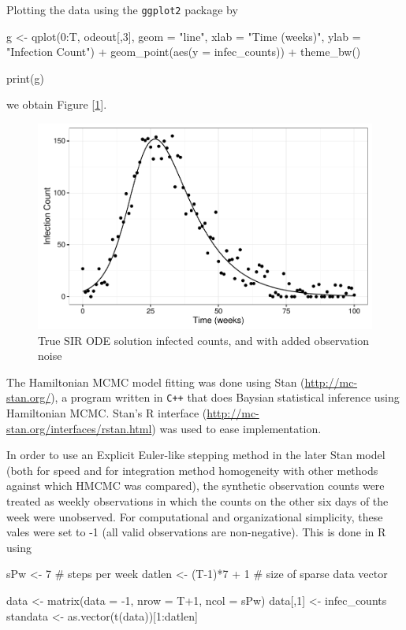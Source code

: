     Plotting the data using the \verb|ggplot2| package by

    \begin{R}
	g <- qplot(0:T, odeout[,3], geom = "line", xlab = "Time (weeks)", ylab = "Infection Count") +
		geom_point(aes(y = infec_counts)) +
		theme_bw()

	print(g)
    \end{R}

    we obtain Figure [\ref{mcmcdataplot}].

    \begin{figure}[H]
        \centering
        \includegraphics[width=\textwidth]{./images/dataplot.pdf}
        \caption{True SIR ODE solution infected counts, and with added observation noise}
        \label{mcmcdataplot}
    \end{figure}

    The Hamiltonian MCMC model fitting was done using Stan (\url{http://mc-stan.org/}), a program written in \verb|C++| that does Baysian statistical inference using Hamiltonian MCMC. Stan's R interface (\url{http://mc-stan.org/interfaces/rstan.html}) was used to ease implementation.

    In order to use an Explicit Euler-like stepping method in the later Stan model (both for speed and for integration method homogeneity with other methods against which HMCMC was compared), the synthetic observation counts were treated as weekly observations in which the counts on the other six days of the week were unobserved. For computational and organizational simplicity, these vales were set to -1 (all valid observations are non-negative). This is done in R using

    \begin{R}
    sPw <- 7               # steps per week
    datlen <- (T-1)*7 + 1  # size of sparse data vector

    data <- matrix(data = -1, nrow = T+1, ncol = sPw)
    data[,1] <- infec_counts
    standata <- as.vector(t(data))[1:datlen]
    \end{R}

